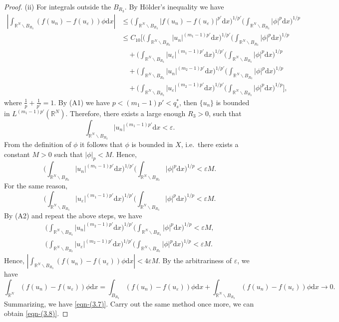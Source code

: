 \documentclass[reqno]{amsart}
\begin{document}
\begin{proof}
(ii) For integrals outside the $B_{R_3}$. By H\"{o}lder's  inequality we have
\begin{align*}
|\int_{\mathbb{R}^N\backslash{B_{R_3}}}(f(u_n)-f(u_\varepsilon))
\phi\mathrm{d}x|
&\leq \Big(\int_{\mathbb{R}^N\backslash{B_{R_3}}}
|f(u_n)-f(u_\varepsilon)|^{p'}\mathrm{d}x\Big)^{1/p'}
\Big(\int_{\mathbb{R}^N\backslash{B_{R_3}}}|\phi|^{p}\mathrm{d}x\Big)^{1/p}\\
&\leq C_{10}\Big[\Big(\int_{\mathbb{R}^N\backslash{B_{R_3}}}|u_n|^{(m_1-1)p'}
 \mathrm{d}x\Big)^{1/p'}\Big(\int_{\mathbb{R}^N\backslash{B_{R_3}}}|\phi|^{p}
 \mathrm{d}x\Big)^{1/p}\\
&\quad +\Big(\int_{\mathbb{R}^N\backslash{B_{R_3}}}|u_\varepsilon|^{(m_1-1)p'}
 \mathrm{d}x\Big)^{1/p'}\Big(\int_{\mathbb{R}^N\backslash{B_{R_3}}}|\phi|^{p}
 \mathrm{d}x\Big)^{1/p}\\
&\quad +\Big(\int_{\mathbb{R}^N\backslash{B_{R_3}}}|u_n|^{(m_2-1)p'}
 \mathrm{d}x\Big)^{1/p'}
 \Big(\int_{\mathbb{R}^N\backslash{B_{R_3}}}|\phi|^{p}\mathrm{d}x\Big)^{1/p}\\
&\quad +\Big(\int_{\mathbb{R}^N\backslash{B_{R_3}}}|u_\varepsilon|^{(m_2-1)p'}
 \mathrm{d}x\Big)^{1/p'}\Big(\int_{\mathbb{R}^N\backslash{B_{R_3}}}|\phi|^{p}
 \mathrm{d}x\Big)^{1/p}\Big],
\end{align*}
where $\frac{1}{p}+\frac{1}{p'}=1$. By (A1) we have $p<(m_1-1)p'<q_{s}^{*}$, then  
$\{u_n\}$ is bounded  in $L^{(m_1-1)p'}(\mathbb{R}^N)$.  Therefore,
there exists a large enough $R_3>0$, such that 
$$
\int_{\mathbb{R}^N\backslash{B_{R_3}}}|u_n|^{(m_1-1)p'}\mathrm{d}x<\varepsilon.
$$
From the definition of $\phi$ it follows that $\phi$ is bounded in $X$, i.e.\
there exists a constant $M>0$ such that $|\phi|_p<M$.
Hence,
$$
\Big(\int_{\mathbb{R}^N\backslash{B_{R_3}}}|u_n|^{(m_1-1)p'}
\mathrm{d}x\Big)^{1/p'} \Big(\int_{\mathbb{R}^N\backslash{B_{R_3}}}
|\phi|^{p}\mathrm{d}x\Big)^{1/p}<\varepsilon M. 
$$
For the same reason,
$$
\Big(\int_{\mathbb{R}^N\backslash{B_{R_3}}}|u_\varepsilon|^{(m_1-1)p'}\mathrm{d}x
 \Big)^{1/p'}
 \Big(\int_{\mathbb{R}^N\backslash{B_{R_3}}}|\phi|^{p}\mathrm{d}x\Big)^{1/p}
 <\varepsilon M.
 $$
By (A2) and repeat the above steps, we have
\begin{gather*}
\Big(\int_{\mathbb{R}^N\backslash{B_{R_3}}}|u_n|^{(m_2-1)p'}\mathrm{d}x\Big)^{1/p'}
\Big(\int_{\mathbb{R}^N\backslash{B_{R_3}}}|\phi|^{p}\mathrm{d}x\Big)^{1/p}
<\varepsilon M,\\
\Big(\int_{\mathbb{R}^N\backslash{B_{R_3}}}|u_\varepsilon|^{(m_2-1)p'}\mathrm{d}x
\Big)^{1/p'}
\Big(\int_{\mathbb{R}^N\backslash{B_{R_3}}}|\phi|^{p}\mathrm{d}x\Big)^{1/p}
<\varepsilon M.
\end{gather*}
Hence, $|\int_{\mathbb{R}^N\backslash{B_{R_3}}}(f(u_n)-f(u_\varepsilon))
\phi\mathrm{d}x|<4\varepsilon M$.
By the arbitrariness of $\varepsilon$, we have
$$
\int_{\mathbb{R}^N}(f(u_n)-f(u_\varepsilon))\phi\mathrm{d}x
=\int_{B_{R_3}}(f(u_n)-f(u_\varepsilon))\phi\mathrm{d}x
 +\int_{\mathbb{R}^N\backslash{B_{R_3}}}(f(u_n)-f(u_\varepsilon))\phi\mathrm{d}x\to 0.
$$
Summarizing, we have \eqref{eqn-(3.7)}.
Carry out the same method once more, we can obtain \eqref{eqn-(3.8)}.


\end{proof}
\end{document}
